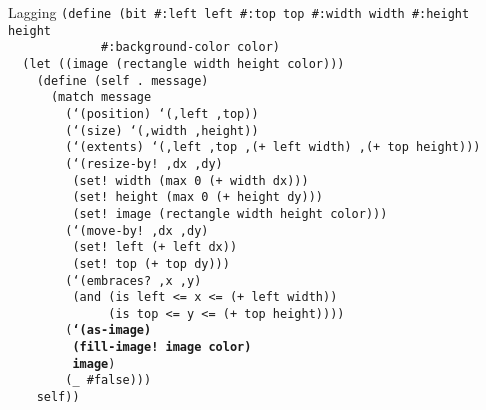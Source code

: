 \begin{frame}{Lagging}
  \tiny
  \texttt{(define (bit \#:left left \#:top top \#:width width \#:height height\\
    \ \ \ \ \ \ \ \ \ \ \ \ \ \#:background-color color)\\
    \ \ (let ((image (rectangle width height color)))\\
    \ \ \ \ (define (self .\ message)\\
    \ \ \ \ \ \ (match message\\
    \ \ \ \ \ \ \ \ (`(position) `(,left ,top))\\
    \ \ \ \ \ \ \ \ (`(size) `(,width ,height))\\
    \ \ \ \ \ \ \ \ (`(extents) `(,left ,top ,(+ left width) ,(+ top height)))\\
    \ \ \ \ \ \ \ \ (`(resize-by!\ ,dx ,dy)\\
    \ \ \ \ \ \ \ \ \ (set!\ width (max 0 (+ width dx)))\\
    \ \ \ \ \ \ \ \ \ (set!\ height (max 0 (+ height dy)))\\
    \ \ \ \ \ \ \ \ \ (set!\ image (rectangle width height color)))\\
    \ \ \ \ \ \ \ \ (`(move-by!\ ,dx ,dy)\\
    \ \ \ \ \ \ \ \ \ (set!\ left (+ left dx))\\
    \ \ \ \ \ \ \ \ \ (set!\ top (+ top dy)))\\
    \ \ \ \ \ \ \ \ (`(embraces?\ ,x ,y)\\
    \ \ \ \ \ \ \ \ \ (and (is left <= x <= (+ left width))\\
    \ \ \ \ \ \ \ \ \ \ \ \ \ \ (is top <= y <= (+ top height))))\\
    \ \ \ \ \ \ \ \ (\textbf{`(as-image)\\
    \ \ \ \ \ \ \ \ \ (fill-image!\ image color)\\
    \ \ \ \ \ \ \ \ \ image})\\
    \ \ \ \ \ \ \ \ (\_ \#false)))\\
    \ \ \ \ self))
  }
\end{frame}

